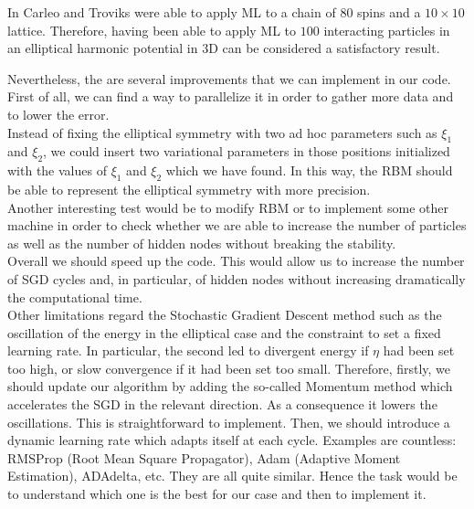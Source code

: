 In \cite{carleoSolvingQuantumManybody2017} Carleo and Troviks were able to apply ML to a chain of $80$ spins and a $10\times 10$ lattice. Therefore, having been able to apply ML to $100$ interacting particles in an elliptical harmonic potential in 3D can be considered a satisfactory result.  


Nevertheless, the are several improvements that we can implement in our code. First of all, we can find a way to parallelize it in order to gather more data and to lower the error. \\
Instead of fixing the elliptical symmetry with two ad hoc parameters such as $\xi_1$ and $\xi_2$, we could insert two variational parameters in those positions initialized with the values of $\xi_1$ and $\xi_2$ which we have found. In this way, the RBM should be able to represent the elliptical symmetry with more precision. \\
Another interesting test would be to modify RBM or to implement some other machine in order to check whether we are able to increase the number of particles as well as the number of hidden nodes without breaking the stability. \\
Overall we should speed up the code. This would allow us to increase the number of SGD cycles and, in particular, of hidden nodes without increasing dramatically the computational time.\\
Other limitations regard the Stochastic Gradient Descent method such as the oscillation of the energy in the elliptical case and the constraint to set a fixed learning rate. In particular, the second led to divergent energy if $\eta$ had been set too high, or slow convergence if it had been set too small. Therefore, firstly, we should update our algorithm by adding the so-called Momentum method which accelerates the SGD in the relevant direction. As a consequence it lowers the oscillations. This is straightforward to implement. Then, we should introduce a dynamic learning rate which adapts itself at each cycle. Examples are countless: RMSProp (Root Mean Square Propagator), Adam (Adaptive Moment Estimation), ADAdelta, etc. They are all quite similar. Hence the task would be to understand which one is the best for our case and then to implement it. 



